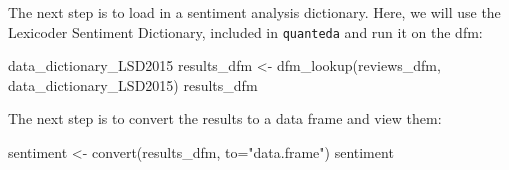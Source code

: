 \documentclass[
]{book}
\newenvironment{Shaded}{\begin{snugshade}}{\end{snugshade}}
\newcommand{\AttributeTok}[1]{\textcolor[rgb]{0.77,0.63,0.00}{#1}}
\newcommand{\FunctionTok}[1]{\textcolor[rgb]{0.00,0.00,0.00}{#1}}
\newcommand{\NormalTok}[1]{#1}
\newcommand{\OtherTok}[1]{\textcolor[rgb]{0.56,0.35,0.01}{#1}}
\newcommand{\StringTok}[1]{\textcolor[rgb]{0.31,0.60,0.02}{#1}}
\begin{document}
The next step is to load in a sentiment analysis dictionary. Here, we will use the Lexicoder Sentiment Dictionary, included in \texttt{quanteda} and run it on the dfm:

\begin{Shaded}
\begin{Highlighting}[]
\NormalTok{data\_dictionary\_LSD2015}
\NormalTok{results\_dfm }\OtherTok{\textless{}{-}} \FunctionTok{dfm\_lookup}\NormalTok{(reviews\_dfm, data\_dictionary\_LSD2015)}
\NormalTok{results\_dfm}
\end{Highlighting}
\end{Shaded}

The next step is to convert the results to a data frame and view them:

\begin{Shaded}
\begin{Highlighting}[]
\NormalTok{sentiment }\OtherTok{\textless{}{-}} \FunctionTok{convert}\NormalTok{(results\_dfm, }\AttributeTok{to=}\StringTok{"data.frame"}\NormalTok{)}
\NormalTok{sentiment}
\end{Highlighting}
\end{Shaded}
\end{document}
